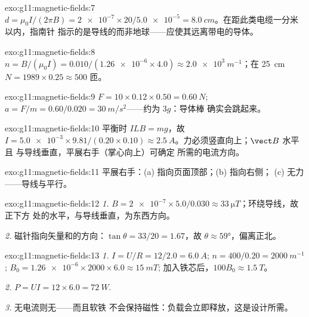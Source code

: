 \begin{solution}{exo:g11:magnetic-fields:7}
$d = \mu_0 I / (2\pi B) = \num{2e-7} \times 20 / \num{5.0e-5}
= \qty{8.0}{cm}$。在距此类电缆一分米以内，指南针
指示的是导线的而非地球——应使其远离带电的导体。
\end{solution}

\begin{solution}{exo:g11:magnetic-fields:8}
$n = B/(\mu_0 I) = 0.010 / (\num{1.26e-6} \times 4.0)
\approx \qty{2.0e3}{m^{-1}}$；在 \qty{25}{cm}
$N = 1989 \times 0.25 \approx 500$ 匝。
\end{solution}

\begin{solution}{exo:g11:magnetic-fields:9}
$F = 10 \times 0.12 \times 0.50 = \qty{0.60}{N}$;
$a = F/m = 0.60/0.020 = \qty{30}{m/s^2}$——约为 $3g$：导体棒
确实会跳起来。
\end{solution}

\begin{solution}{exo:g11:magnetic-fields:10}
平衡时 $ILB = mg$，故
$I = \num{5.0e-3} \times 9.81 / (0.20 \times 0.10) \approx
\qty{2.5}{A}$。力必须竖直向上；$\vect B$ 水平且
与导线垂直，平展右手（掌心向上）可确定
所需的电流方向。
\end{solution}

\begin{solution}{exo:g11:magnetic-fields:11}
平展右手：(a) 指向页面顶部；(b) 指向右侧；
(c) 无力——导线与平行。
\end{solution}

\begin{solution}{exo:g11:magnetic-fields:12}
\emph{1.} $B = \num{2e-7} \times 5.0 / 0.030 \approx
\qty{33}{\micro T}$；环绕导线，故正下方
处的水平，与导线垂直，为东西方向。

\emph{2.} 磁针指向矢量和的方向：$\tan\theta = 33/20 =
1.67$，故 $\theta \approx \ang{59}$，偏离正北。
\end{solution}

\begin{solution}{exo:g11:magnetic-fields:13}
\emph{1.} $I = U/R = 12/2.0 = \qty{6.0}{A}$;
$n = 400/0.20 = \qty{2000}{m^{-1}}$;
$B_0 = \num{1.26e-6} \times 2000 \times 6.0 \approx \qty{15}{mT}$;
加入铁芯后，$100 B_0 \approx \qty{1.5}{T}$。

\emph{2.} $P = UI = 12 \times 6.0 = \qty{72}{W}$.

\emph{3.} 无电流则无——而且软铁
不会保持磁性：负载会立即释放，这是设计所需。
\end{solution}

